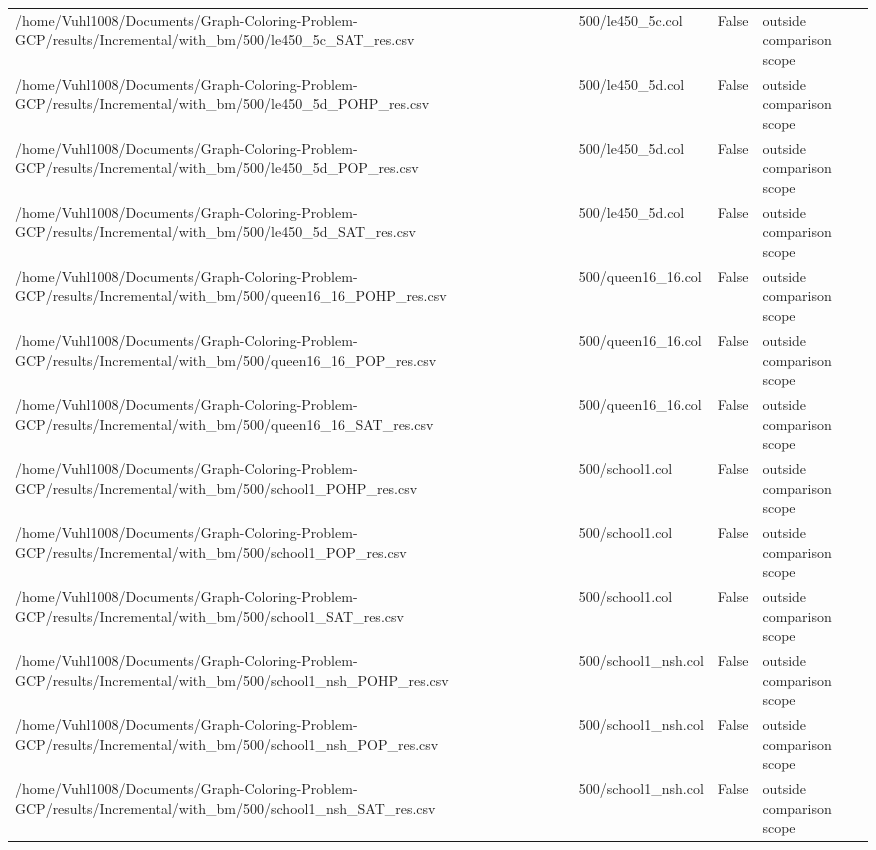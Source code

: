 \begin{table}[htbp]
\begin{tabular}{llll}
/home/Vuhl1008/Documents/Graph-Coloring-Problem-GCP/results/Incremental/with\_bm/500/le450\_5c\_SAT\_res.csv & 500/le450\_5c.col & False & outside comparison scope \\
/home/Vuhl1008/Documents/Graph-Coloring-Problem-GCP/results/Incremental/with\_bm/500/le450\_5d\_POHP\_res.csv & 500/le450\_5d.col & False & outside comparison scope \\
/home/Vuhl1008/Documents/Graph-Coloring-Problem-GCP/results/Incremental/with\_bm/500/le450\_5d\_POP\_res.csv & 500/le450\_5d.col & False & outside comparison scope \\
/home/Vuhl1008/Documents/Graph-Coloring-Problem-GCP/results/Incremental/with\_bm/500/le450\_5d\_SAT\_res.csv & 500/le450\_5d.col & False & outside comparison scope \\
/home/Vuhl1008/Documents/Graph-Coloring-Problem-GCP/results/Incremental/with\_bm/500/queen16\_16\_POHP\_res.csv & 500/queen16\_16.col & False & outside comparison scope \\
/home/Vuhl1008/Documents/Graph-Coloring-Problem-GCP/results/Incremental/with\_bm/500/queen16\_16\_POP\_res.csv & 500/queen16\_16.col & False & outside comparison scope \\
/home/Vuhl1008/Documents/Graph-Coloring-Problem-GCP/results/Incremental/with\_bm/500/queen16\_16\_SAT\_res.csv & 500/queen16\_16.col & False & outside comparison scope \\
/home/Vuhl1008/Documents/Graph-Coloring-Problem-GCP/results/Incremental/with\_bm/500/school1\_POHP\_res.csv & 500/school1.col & False & outside comparison scope \\
/home/Vuhl1008/Documents/Graph-Coloring-Problem-GCP/results/Incremental/with\_bm/500/school1\_POP\_res.csv & 500/school1.col & False & outside comparison scope \\
/home/Vuhl1008/Documents/Graph-Coloring-Problem-GCP/results/Incremental/with\_bm/500/school1\_SAT\_res.csv & 500/school1.col & False & outside comparison scope \\
/home/Vuhl1008/Documents/Graph-Coloring-Problem-GCP/results/Incremental/with\_bm/500/school1\_nsh\_POHP\_res.csv & 500/school1\_nsh.col & False & outside comparison scope \\
/home/Vuhl1008/Documents/Graph-Coloring-Problem-GCP/results/Incremental/with\_bm/500/school1\_nsh\_POP\_res.csv & 500/school1\_nsh.col & False & outside comparison scope \\
/home/Vuhl1008/Documents/Graph-Coloring-Problem-GCP/results/Incremental/with\_bm/500/school1\_nsh\_SAT\_res.csv & 500/school1\_nsh.col & False & outside comparison scope \\

\end{tabular}
\end{table}
